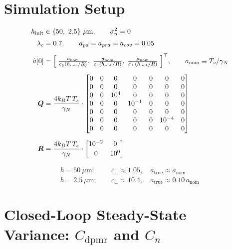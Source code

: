 \documentclass[11pt]{article}
\newcommand{\T}{^{\top}}
\newcommand{\lc}{\lambda_c}
\newcommand{\Ts}{T_s}
\newcommand{\kB}{k_B}
\begin{document}
\section{Simulation Setup}

\begin{align}
h_{\mathrm{init}} &\in \{50,\ 2.5\}\ \mu\mathrm{m},
  \qquad \sigma^{2}_n = 0 \\[2pt]
\lc &= 0.7,
  \qquad a_{pd} = a_{prd} = a_{cov} = 0.05 \\[4pt]
\hat{a}[0] &= \Bigl[\;
  \tfrac{a_{\mathrm{nom}}}{c_{\parallel}(h_{\mathrm{init}}/R)},\;
  \tfrac{a_{\mathrm{nom}}}{c_{\parallel}(h_{\mathrm{init}}/R)},\;
  \tfrac{a_{\mathrm{nom}}}{c_{\perp}(h_{\mathrm{init}}/R)}
\;\Bigr]\T,
  \qquad a_{\mathrm{nom}} \equiv \Ts / \gamma_N \\[6pt]
\bm{Q} &= \frac{4\kB T\,\Ts}{\gamma_N}\cdot
\begin{bmatrix}
  0 & 0 & 0 & 0 & 0 & 0 & 0 \\
  0 & 0 & 0 & 0 & 0 & 0 & 0 \\
  0 & 0 & 10^{4} & 0 & 0 & 0 & 0 \\
  0 & 0 & 0 & 10^{-1} & 0 & 0 & 0 \\
  0 & 0 & 0 & 0 & 0 & 0 & 0 \\
  0 & 0 & 0 & 0 & 0 & 10^{-4} & 0 \\
  0 & 0 & 0 & 0 & 0 & 0 & 0
\end{bmatrix} \\[6pt]
\bm{R} &= \frac{4\kB T\,\Ts}{\gamma_N}\cdot
\begin{bmatrix}
  10^{-2} & 0 \\[2pt]
  0 & 10^{0}
\end{bmatrix}
\end{align}

\begin{align*}
h = 50\ \mu\mathrm{m}:\ &\quad c_\perp \approx 1.05,
  \quad a_{\mathrm{true}} \approx a_{\mathrm{nom}} \\
h = 2.5\ \mu\mathrm{m}:\ &\quad c_\perp \approx 10.4,
  \quad a_{\mathrm{true}} \approx 0.10\,a_{\mathrm{nom}}
\end{align*}

\section{Closed-Loop Steady-State Variance: $C_{\mathrm{dpmr}}$ and $C_{n}$}
\end{document}
